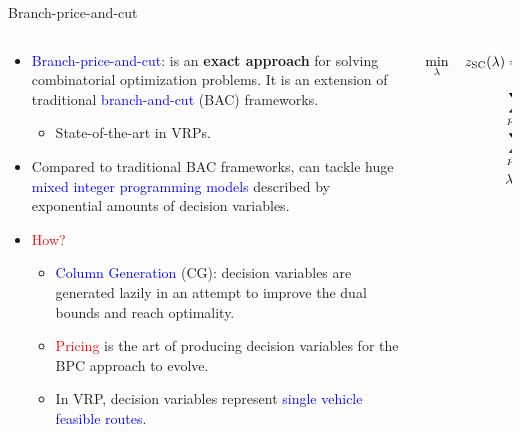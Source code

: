 \begin{frame}{Branch-price-and-cut}
	\begin{columns}
		\begin{column}{.8\textwidth}

			\begin{itemize}
				\item \textcolor{blue}{Branch-price-and-cut}: is an \textbf{exact approach} for solving combinatorial optimization problems. It is an extension of traditional \textcolor{blue}{branch-and-cut} (BAC) frameworks.
				      \begin{itemize}
					      \item State-of-the-art in VRPs.
				      \end{itemize}
				\item Compared to traditional BAC frameworks, can tackle huge \textcolor{blue}{mixed integer programming models} described by exponential amounts of decision variables.
				\item \textcolor{red}{How?}
				      \begin{itemize}
					      \item \textcolor{blue}{Column Generation} (CG): decision variables are generated lazily in an attempt to improve the dual bounds and reach optimality.
					      \item \textcolor{red}{Pricing} is the art of producing decision variables for the BPC approach to evolve.
					      \item In VRP, decision variables represent \textcolor{blue}{single vehicle feasible routes}.
				      \end{itemize}
			\end{itemize}
		\end{column}
		\begin{column}{.2\textwidth}
			\begin{tiny}
				\begin{align*}
					\min_{\lambda} \quad z_\mt{SC}(\lambda) & = \sum_{p \in P}  c_p \lambda_p                                      \\
					                                        & \sum_{p \in P} \lambda_{p} = K                                       \\
					                                        & \sum_{p \in P}  a_{ip} \lambda_p \ge 1       \quad \forall i \in V_0 \\
					                                        & \lambda_p                    \in \Set*{0, 1} \quad \forall p \in P.
				\end{align*}
			\end{tiny}
		\end{column}

	\end{columns}
\end{frame}

